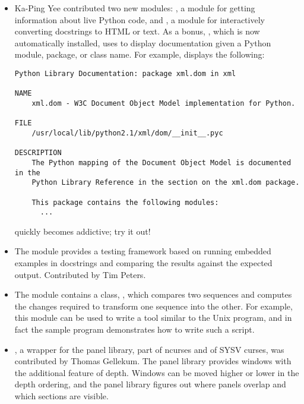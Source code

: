 \documentclass{howto}
\begin{document}
\begin{itemize}

\item Ka-Ping Yee contributed two new modules: , a module for
getting information about live Python code, and , a
module for interactively converting docstrings to HTML or text.
As a bonus, , which is now automatically
installed, uses  to display documentation given a Python module, package, or class name.  For example,
 displays the following:

\begin{verbatim}
Python Library Documentation: package xml.dom in xml
 
NAME
    xml.dom - W3C Document Object Model implementation for Python.
 
FILE
    /usr/local/lib/python2.1/xml/dom/__init__.pyc
 
DESCRIPTION
    The Python mapping of the Document Object Model is documented in the
    Python Library Reference in the section on the xml.dom package.
 
    This package contains the following modules:
      ...
\end{verbatim}

 quickly becomes addictive; try it out!

\item The  module provides a testing framework based
on running embedded examples in docstrings and comparing the results
against the expected output.  Contributed by Tim Peters.

\item The  module contains a class,
, which compares two sequences and computes the
changes required to transform one sequence into the other.  For
example, this module can be used to write a tool similar to the Unix
 program, and in fact the sample program
 demonstrates how to write such a script.  

\item {}, a wrapper for the panel library, part of
ncurses and of SYSV curses, was contributed by Thomas Gellekum.  The
panel library provides windows with the additional feature of depth.
Windows can be moved higher or lower in the depth ordering, and the
panel library figures out where panels overlap and which sections are
visible.


\end{itemize}
\end{document}
